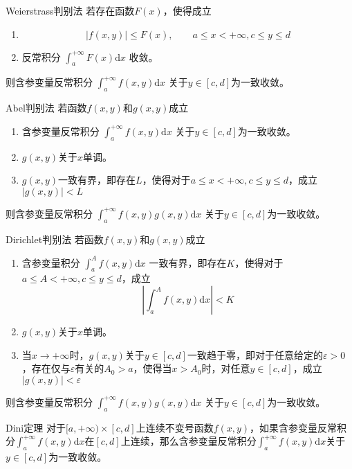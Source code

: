 \documentclass[lang = cn, scheme = chinese, thmcnt = section]{elegantbook}
\newcommand{\dis}{\displaystyle}
\begin{document}
\begin{theorem}{Weierstrass判别法}
	若存在函数$F(x)$​，使得成立
	\begin{enumerate}
		\item 
		$$
		|f(x,y)|\le F(x),\qquad a\le x<+\infty,c\le y\le d
		$$
		\item 反常积分
		$\dis\int_{a}^{+\infty}{F(x)\mathrm{d}x}$
		收敛。
	\end{enumerate}
	则含参变量反常积分
	$\dis\int_{a}^{+\infty}{f(x,y)\mathrm{d}x}$
	关于$y\in[c,d]$为一致收敛。
\end{theorem}

\begin{theorem}{Abel判别法}
	若函数$f(x,y)$和$g(x,y)$成立
	\begin{enumerate}
		\item 含参变量反常积分
		$\dis\int_{a}^{+\infty}{f(x,y)\mathrm{d}x}$
		关于$y\in[c,d]$为一致收敛。
		\item $g(x,y)$关于$x$单调。
		\item $g(x,y)$一致有界，即存在$L$，使得对于$a\le x<+\infty,c\le y\le d$，成立
		$|g(x,y)|<L$
	\end{enumerate}
	则含参变量反常积分
	$\dis\int_{a}^{+\infty}{f(x,y)g(x,y)\mathrm{d}x}$
	关于$y\in[c,d]$为一致收敛。
\end{theorem}

\begin{theorem}{Dirichlet判别法}
	若函数$f(x,y)$和$g(x,y)$成立
	\begin{enumerate}
		\item 含参变量积分
		$\dis\int_{a}^{A}{f(x,y)\mathrm{d}x}$
		一致有界，即存在$K$，使得对于$a\le A<+\infty,c\le y\le d$，成立
		$$
		\left|\int_{a}^{A}{f(x,y)\mathrm{d}x}\right|<K
		$$
		\item $g(x,y)$关于$x$单调。
		\item 当$x\to+\infty$时，$g(x,y)$关于$y\in[c,d]$一致趋于零，即对于任意给定的$\varepsilon>0$，存在仅与$\varepsilon$有关的$A_0>a$，使得当$x>A_0$时，对任意$y\in[c,d]$，成立
		$|g(x,y)|<\varepsilon$
	\end{enumerate}
	则含参变量反常积分
	$\dis\int_{a}^{+\infty}{f(x,y)g(x,y)\mathrm{d}x}$
	关于$y\in[c,d]$为一致收敛。
\end{theorem}

\begin{theorem}{Dini定理}
	对于$[a,+\infty)\times[c,d]$上连续不变号函数$f(x,y)$，如果含参变量反常积分$\dis \int_{a}^{+\infty}{f(x,y)\mathrm{d}x}$在$[c,d]$上连续，那么含参变量反常积分$\dis \int_{a}^{+\infty}{f(x,y)\mathrm{d}x}$关于$y\in[c,d]$为一致收敛。
\end{theorem}
\end{document}
